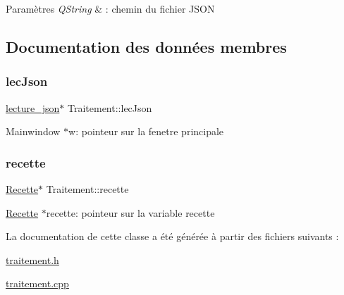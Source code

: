 \begin{DoxyParams}{Paramètres}
{\em Q\+String} & \+: chemin du fichier J\+S\+ON \\
\hline
\end{DoxyParams}


\subsection{Documentation des données membres}
\mbox{\label{classTraitement_ac7e6ff3bfc54975b1c8831a2ad8fc9a4}} 
\subsubsection{\texorpdfstring{lec\+Json}{lecJson}}
{\footnotesize\ttfamily \hyperlink{classlecture__json}{lecture\+\_\+json}$\ast$ Traitement\+::lec\+Json\hspace{0.3cm}{\ttfamily [private]}}

Mainwindow $\ast$w\+: pointeur sur la fenetre principale \mbox{\label{classTraitement_afc8ac78bded6d17a86323544aa00d91b}} 
\subsubsection{\texorpdfstring{recette}{recette}}
{\footnotesize\ttfamily \hyperlink{classRecette}{Recette}$\ast$ Traitement\+::recette\hspace{0.3cm}{\ttfamily [private]}}

\hyperlink{classRecette}{Recette} $\ast$recette\+: pointeur sur la variable recette 

La documentation de cette classe a été générée à partir des fichiers suivants \+:\begin{DoxyCompactItemize}
\item 
\hyperlink{traitement_8h}{traitement.\+h}\item 
\hyperlink{traitement_8cpp}{traitement.\+cpp}\end{DoxyCompactItemize}
